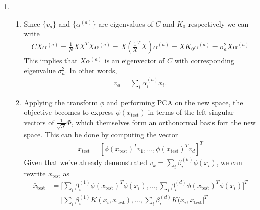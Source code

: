 \documentclass[11pt,letter]{article}
\begin{document}
\begin{enumerate}
\item \begin{enumerate}

    \item Since $\{v_a\}$ and $\{\alpha^{(a)}\}$ are eigenvalues of $C$ and $K_0$ respectively we can write
    \begin{align*}
        CX\alpha^{(a)} = \frac{1}{N}XX^TX\alpha^{(a)} = X(\frac{1}X^TX)\alpha^{(a)} = XK_0\alpha^{(a)} = \sigma_a^2 X\alpha^{(a)}
    \end{align*}
    This implies that $X\alpha^{(a)}$ is an eigenvector of $C$ with corresponding eigenvalue $\sigma_a^2$. In other words,
    \begin{align*}
        v_a = \sum_i \alpha_i^{(a)}x_i.
    \end{align*}

    \item Applying the transform $\phi$ and performing PCA on the new space, the objective becomes to express $\phi(x_{\text{test}})$ in terms of the left singular vectors of $\frac{1}{\sqrt N} \Phi$, which themselves form an orthonormal basis fort the new space. This can be done by computing the vector
    \begin{align*}
        \bar x_{\text{test}} = [\phi(x_{\text{test}})^T v_1, \dots, \phi(x_{\text{test}})^Tv_d]^T
    \end{align*}
    Given that we've already demonstrated $v_k = \sum_i \beta_i^{(k)}\phi(x_i)$, we can rewrite $\bar x_{\text{test}}$ as
    \begin{align*}
        \bar x_{\text{test}} & = \big[\sum_i \beta_i^{(1)}\phi(x_{\text{test}})^T \phi(x_i), \dots,\sum_i \beta_i^{(d)}\phi(x_{\text{test}})^T \phi(x_i)    \big]^T \\
        & = \big[\sum_i \beta_i^{(1)} K(x_i,x_{\text{test}}), \dots,\sum_i \beta_i^{(d)}K(x_i,x_{\text{test}}\big]^T
    \end{align*}
    \end{enumerate}


\end{enumerate}
\end{document}
